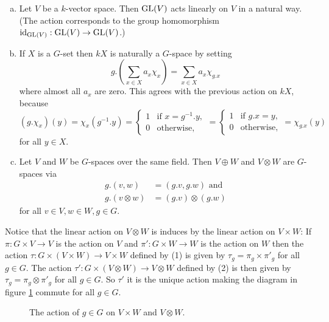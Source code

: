 \begin{expls}
 \begin{enumerate}[a)]
  \item
   Let $V$ be a $k$-vector space. Then $\operatorname{GL}(V)$ acts linearly on $V$ in a natural way. (The action corresponds to the group homomorphism $\operatorname{id}_{\operatorname{GL}(V)} : \operatorname{GL}(V) \to \operatorname{GL}(V)$.)
  \item
   If $X$ is a $G$-set then $kX$ is naturally a $G$-space by setting
   \[
    g.\left(\sum_{x \in X} a_x \chi_x\right) = \sum_{x \in X} a_x \chi_{g.x}
   \]
   where almost all $a_x$ are zero. This agrees with the previous action on $kX$, because
   \[
    (g.\chi_x)(y)
    = \chi_x(g^{-1}.y)
    = \begin{cases} 1 & \text{if } x = g^{-1}.y, \\ 0 & \text{otherwise}, \end{cases}
    = \begin{cases} 1 & \text{if } g.x = y, \\ 0 & \text{otherwise}, \end{cases}
    = \chi_{g.x}(y)
   \]
   for all $y \in X$.
  \item
   Let $V$ and $W$ be $G$-spaces over the same field. Then $V \oplus W$ and $V \otimes W$ are $G$-spaces via
   \begin{align*}
    g.(v,w) &= (g.v,g.w) \text{ and }  \tag{1} \\
    g.(v \otimes w) &= (g.v) \otimes (g.w) \tag{2}
   \end{align*}
   for all $v \in V, w \in W, g \in G$.
 \end{enumerate}
 
 Notice that the linear action on $V \otimes W$ is induces by the linear action on $V \times W$: If $\pi : G \times V \to V$ is the action on $V$ and $\pi' : G \times W \to W$ is the action on $W$ then the action $\tau : G \times (V \times W) \to V \times W$ defined by (1) is given by $\tau_g = \pi_g \times \pi'_g$ for all $g \in G$. The action $\tau': G \times (V \otimes W) \to V \otimes W$ defined by (2) is then given by $\tau_g = \pi_g \otimes \pi'_g$ for all $g \in G$. So $\tau'$ it is the unique action making the diagram in figure \ref{fig: action on product and tensor} commute for all $g \in G$.
 \begin{figure}\label{fig: action on product and tensor}\centering
  \caption{The action of $g \in G$ on $V \times W$ and $V \otimes W$.}
 \end{figure}
 

\end{expls}
